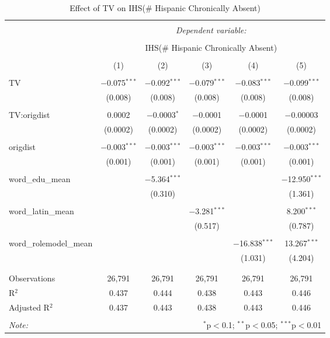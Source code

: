 
\begin{table}[!htbp] \centering 
  \caption{Effect of TV on IHS(\# Hispanic Chronically Absent)} 
  \label{} 
\begin{tabular}{@{\extracolsep{-2pt}}lccccc} 
\\[-1.8ex]\hline 
\hline \\[-1.8ex] 
 & \multicolumn{5}{c}{\textit{Dependent variable:}} \\ 
\cline{2-6} 
\\[-1.8ex] & \multicolumn{5}{c}{IHS(\# Hispanic Chronically Absent)} \\ 
\\[-1.8ex] & (1) & (2) & (3) & (4) & (5)\\ 
\hline \\[-1.8ex] 
 TV & $-$0.075$^{***}$ & $-$0.092$^{***}$ & $-$0.079$^{***}$ & $-$0.083$^{***}$ & $-$0.099$^{***}$ \\ 
  & (0.008) & (0.008) & (0.008) & (0.008) & (0.008) \\ 
  & & & & & \\ 
 TV:origdist & 0.0002 & $-$0.0003$^{*}$ & $-$0.0001 & $-$0.0001 & $-$0.00003 \\ 
  & (0.0002) & (0.0002) & (0.0002) & (0.0002) & (0.0002) \\ 
  & & & & & \\ 
 origdist & $-$0.003$^{***}$ & $-$0.003$^{***}$ & $-$0.003$^{***}$ & $-$0.003$^{***}$ & $-$0.003$^{***}$ \\ 
  & (0.001) & (0.001) & (0.001) & (0.001) & (0.001) \\ 
  & & & & & \\ 
 word\_edu\_mean &  & $-$5.364$^{***}$ &  &  & $-$12.950$^{***}$ \\ 
  &  & (0.310) &  &  & (1.361) \\ 
  & & & & & \\ 
 word\_latin\_mean &  &  & $-$3.281$^{***}$ &  & 8.200$^{***}$ \\ 
  &  &  & (0.517) &  & (0.787) \\ 
  & & & & & \\ 
 word\_rolemodel\_mean &  &  &  & $-$16.838$^{***}$ & 13.267$^{***}$ \\ 
  &  &  &  & (1.031) & (4.204) \\ 
  & & & & & \\ 
\hline \\[-1.8ex] 
Observations & 26,791 & 26,791 & 26,791 & 26,791 & 26,791 \\ 
R$^{2}$ & 0.437 & 0.444 & 0.438 & 0.443 & 0.446 \\ 
Adjusted R$^{2}$ & 0.437 & 0.443 & 0.438 & 0.443 & 0.446 \\ 
\hline 
\hline \\[-1.8ex] 
\textit{Note:}  & \multicolumn{5}{r}{$^{*}$p$<$0.1; $^{**}$p$<$0.05; $^{***}$p$<$0.01} \\ 
\end{tabular} 
\end{table} 
